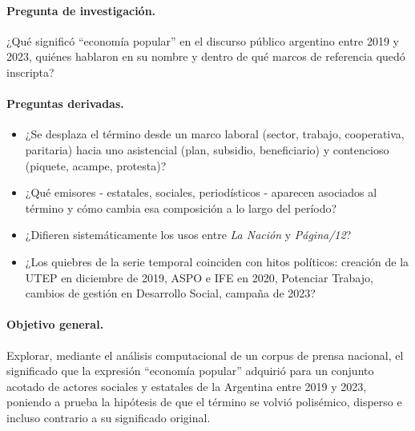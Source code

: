 \documentclass[11pt,a4paper]{article}
\newcommand{\pdoce}{\textit{Página/12}}
\newcommand{\lanac}{\textit{La Nación}}
\newcommand{\EP}{economía popular}
\begin{document}
\paragraph{Pregunta de investigación.} ¿Qué significó \enquote{\EP} en el discurso público argentino entre 2019 y 2023, quiénes hablaron en su nombre y dentro de qué marcos de referencia quedó inscripta?

\paragraph{Preguntas derivadas.}
\begin{itemize}
  \item ¿Se desplaza el término desde un marco laboral (sector, trabajo, cooperativa, paritaria) hacia uno asistencial (plan, subsidio, beneficiario) y contencioso (piquete, acampe, protesta)?
  \item ¿Qué emisores - estatales, sociales, periodísticos - aparecen asociados al término y cómo cambia esa composición a lo largo del período?
  \item ¿Difieren sistemáticamente los usos entre \lanac{} y \pdoce{}?
  \item ¿Los quiebres de la serie temporal coinciden con hitos políticos: creación de la UTEP en diciembre de 2019, ASPO e IFE en 2020, Potenciar Trabajo, cambios de gestión en Desarrollo Social, campaña de 2023?
\end{itemize}

\paragraph{Objetivo general.} Explorar, mediante el análisis computacional de un corpus de prensa nacional, el significado que la expresión \enquote{\EP} adquirió para un conjunto acotado de actores sociales y estatales de la Argentina entre 2019 y 2023, poniendo a prueba la hipótesis de que el término se volvió polisémico, disperso e incluso contrario a su significado original.
\end{document}
